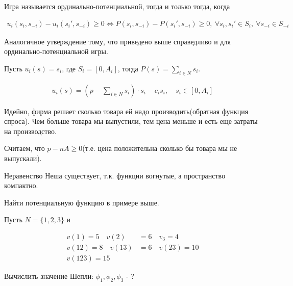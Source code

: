 \documentclass[../main.tex]{subfiles}
\begin{document}
\begin{df}
	Игра называется ординально-потенциальной, тогда и только тогда, когда 

	\begin{align*}
		u_i(s_i, s_{-i}) - u_i(s_i', s_{-i}) \geqslant 0 \iff P(s_i, s_{-i}) - P(s_i', s_{-i}) \geqslant 0, \ \forall s_i, s_i' \in S_i, \ \forall s_{-i} \in S_{-i}
	\end{align*}

	Аналогичное утверждение тому, что приведено выше справедливо и для ординально-потенциальной игры.
\end{df}

\begin{exmpl}
	Пусть $u_i(s) = s_i$, где  $S_i = [0, A_i]$, тогда  $P(s) = \sum_{i \in N} s_i$.
\end{exmpl}

\begin{exmpl}
	\begin{align*}
		u_i(s) = (p - \sum_{i \in N} s_i) \cdot s_i - c_i s_i, \quad s_i \in [0, A_i]
	\end{align*}

	Идейно, фирма решает сколько товара ей надо производить(обратная функция спроса).
	Чем больше товара мы выпустили, тем цена меньше и есть еще затраты на производство.

	Считаем, что $p - n A \geqslant 0$(т.е. цена положительна сколько бы товара мы не выпускали).

	Неравенство Неша существует, т.к. функции вогнутые, а пространство компактно.

\end{exmpl}

\begin{problem}
	Найти потенциальную функцию в примере выше.
\end{problem}

\begin{problem}
	Пусть $N = \{1, 2, 3\}$ и 

	\begin{align*}
		v(1) = 5 \quad v(2) &= 6 \quad v_3 = 4 \\
		v(12) = 8 \quad v(13) &= 6 \quad v(23) = 10 \\
		v(123) = 15
	\end{align*}

	Вычислить значение Шепли:  $\phi_1, \phi_2, \phi_3$ - ?

\end{problem}
\end{document}
